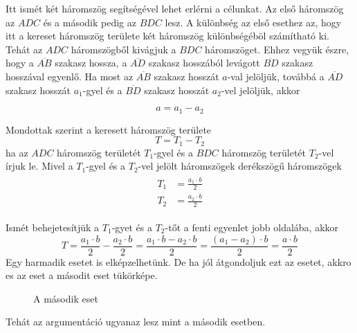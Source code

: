 \documentclass[11pt, a4paper]{article}
\begin{document}
Itt ism\'et k\'et h\'aromszög seg\'its\'eg\'evel lehet erl\'erni a c\'elunkat. Az els\H{o} h\'aromszög az $ADC$ \'es a m\'asodik pedig az $BDC$ lesz. A különbs\'eg az els\H{o} esethez az, hogy itt a kereset h\'aromszög területe k\'et h\'aromszög különbs\'eg\'eböl sz\'am\'ithat\'o ki. Teh\'at az $ADC$ h\'aromszögb\H{o}l kiv\'agjuk a $BDC$ h\'aromszöget. Ehhez vegyük \'eszre, hogy a $\overline{AB}$ szakasz hossza, a $\overline{AD}$ szakasz hossz\'ab\'ol lev\'agott $\overline{BD}$ szakasz hossz\'aval egyenl\H{o}. Ha most az $\overline{AB}$ szakasz hossz\'at $a$-val jelöljük, tov\'abb\'a a $\overline{AD}$ szakasz hossz\'at $a_1$-gyel \'es a $\overline{BD}$ szakasz hossz\'at $a_2$-vel jelöljük, akkor

\[
 a = a_1 - a_2
\]

Mondottak szerint a keresett h\'aromszög területe
\[
 T = T_1 - T_2
\]
ha az $ADC$ h\'aromszög terület\'et $T_1$-gyel \'es a $BDC$ h\'aromszög terület\'et $T_2$-vel \'irjuk le. Mivel a $T_1$-gyel \'es a $T_2$-vel jelölt h\'aromszögek der\'ekszög\H{u} h\'aromszögek
\begin{align}
 \begin{aligned}
     T_1 &= \frac{a_1\cdot b}{2} \\
     T_2 &= \frac{a_2\cdot b}{2}
 \end{aligned}
 \end{align}

Ism\'et behejetes\'itjük a $T_1$-gyet \'es a $T_2$-t\H{o}t a fenti egyenlet jobb oldal\'aba, akkor
 \[
     T = \frac{a_1\cdot b}{2} - \frac{a_2\cdot b}{2} = \frac{a_1\cdot b - a_2\cdot b}{2} = \frac{(a_1 - a_2) \cdot b}{2} = \frac{a\cdot b}{2}
 \]
\newpage
Egy harmadik esetet is elk\'epzelhetünk. De ha j\'ol \'atgondoljuk ezt az esetet, akkro es az eset a m\'asodit eset tükörk\'epe.

\begin{figure}[h]
\centering
{}
    \caption{A m\'asodik eset}
\label{fig:tri1}
\end{figure}

Teh\'at az argument\'aci\'o ugyanaz lesz mint a m\'asodik esetben.
\end{document}
